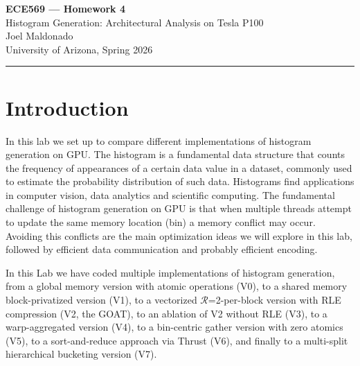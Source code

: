 \documentclass[11pt, letterpaper]{article}
\begin{document}
\begin{center}
  {\LARGE \textbf{ECE569 — Homework 4}} \\[6pt]
  {\large Histogram Generation: Architectural Analysis on Tesla P100} \\[8pt]
  Joel Maldonado \\
  University of Arizona, Spring 2026
\end{center}
\vspace{0.5em}\hrule\vspace{1.5em}

\section*{Introduction}
In this lab we set up to compare different implementations of histogram 
generation on GPU.  The histogram is a fundamental data structure that counts the frequency
of appearances of a certain data value in a dataset, commonly used to estimate 
the probability distribution of such data. Histograms find applications 
in computer vision, data analytics and scientific computing. The fundamental
challenge of histogram generation on GPU is that when multiple threads
attempt to update the same memory location (bin) a memory conflict may occur.
Avoiding this conflicts are the main optimization ideas we will explore in this lab,
followed by efficient data communication and probably efficient encoding.

In this Lab we have coded multiple implementations of histogram generation,
from a global memory version with atomic operations (V0),
to a shared memory block-privatized version (V1),
to a vectorized $\mathcal{R}$=2-per-block version with RLE compression (V2, the GOAT),
to an ablation of V2 without RLE (V3),
to a warp-aggregated version (V4),
to a bin-centric gather version with zero atomics (V5),
to a sort-and-reduce approach via Thrust (V6),
and finally to a multi-split hierarchical bucketing version (V7).
\end{document}
